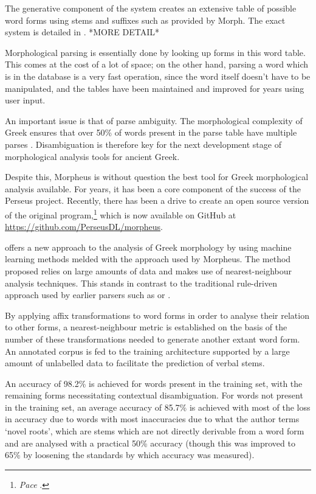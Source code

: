 The generative component of the system creates an extensive table of
possible word forms using stems and suffixes such as provided by
Morph. The exact system is detailed in \cite{crane1991generating}. *MORE DETAIL*

Morphological parsing is essentially done by looking up forms in this
word table. This comes at the cost of a lot of space; on the other
hand, parsing a word which is in the database is a very fast
operation, since the word itself doesn't have to be manipulated, and
the tables have been maintained and improved for years using
user input.

An important issue is that of parse ambiguity. The morphological
complexity of Greek ensures that over 50\% of words present in the
parse table have multiple parses \cite{dik2008}. Disambiguation is
therefore key for the next development stage of morphological analysis
tools for ancient Greek.

Despite this, Morpheus is without question the best tool for Greek
morphological analysis available. For years, it has been a core
component of the success of the Perseus project. Recently, there has
been a drive to create an open source version of the original
program,\footnote{\textit{Pace} \cite{blackwell2009}.} which is now
available on GitHub at \url{https://github.com/PerseusDL/morpheus}.

\cite{lee2008nearest} offers a new approach to the analysis of Greek
morphology by using machine learning methods melded with the approach
used by Morpheus. The method proposed relies on large amounts of data
and makes use of nearest-neighbour analysis techniques. This stands in
contrast to the traditional rule-driven approach used by earlier
parsers such as \cite{packard1973computer} or
\cite{crane1991generating}.

By applying affix transformations to word forms in order to analyse
their relation to other forms, a nearest-neighbour metric is
established on the basis of the number of these transformations needed
to generate another extant word form. An annotated corpus is fed to
the training architecture supported by a large amount of unlabelled data to
facilitate the prediction of verbal stems.

An accuracy of 98.2\% is achieved for words present in the training
set, with the remaining forms necessitating contextual
disambiguation. For words not present in the training set, an average
accuracy of 85.7\% is achieved with most of the loss in accuracy due
to words with most inaccuracies due to what the author terms `novel
roots', which are stems which are not directly derivable from a word
form and are analysed with a practical 50\% accuracy (though this was
improved to 65\% by loosening the standards by which accuracy was
measured).

